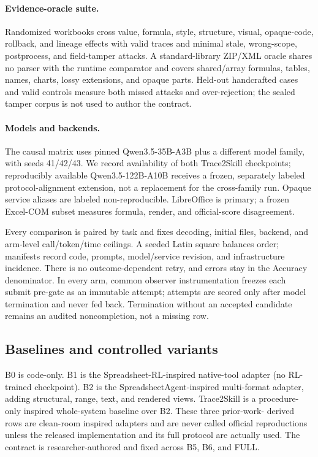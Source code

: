 \paragraph{Evidence-oracle suite.}
Randomized workbooks cross value, formula, style, structure, visual, opaque-code,
rollback, and lineage effects with valid traces and minimal stale, wrong-scope,
postprocess, and field-tamper attacks. A standard-library ZIP/XML oracle shares
no parser with the runtime comparator and covers shared/array formulas, tables,
names, charts, lossy extensions, and opaque parts. Held-out handcrafted cases
and valid controls measure both missed attacks and over-rejection; the sealed
tamper corpus is not used to author the contract.

\paragraph{Models and backends.}
The causal matrix uses pinned Qwen3.5-35B-A3B plus a different model family,
with seeds 41/42/43. We record availability of both Trace2Skill checkpoints;
reproducibly available Qwen3.5-122B-A10B receives a frozen, separately labeled
protocol-alignment extension, not a replacement for the cross-family run.
Opaque service aliases are labeled non-reproducible. LibreOffice is primary; a
frozen Excel-COM subset measures formula, render, and official-score disagreement.

Every comparison is paired by task and fixes decoding, initial files, backend,
and arm-level call/token/time ceilings. A seeded Latin square balances order;
manifests record code, prompts, model/service revision, and infrastructure
incidence. There is no outcome-dependent retry, and errors stay in the Accuracy
denominator. In every arm, common observer instrumentation freezes each submit
pre-gate as an immutable attempt; attempts are scored only after model
termination and never fed back. Termination without an accepted candidate
remains an audited noncompletion, not a missing row.

\subsection{Baselines and controlled variants}

B0 is code-only. B1 is the Spreadsheet-RL-inspired native-tool adapter (no
RL-trained checkpoint). B2 is the SpreadsheetAgent-inspired multi-format
adapter, adding structural, range, text, and rendered views. Trace2Skill is a
procedure-only inspired whole-system baseline over B2. These three prior-work-
derived rows are clean-room inspired adapters and are never called official
reproductions unless the released implementation and its full protocol are
actually used. The \method{} contract is researcher-authored and fixed across
B5, B6, and FULL.

